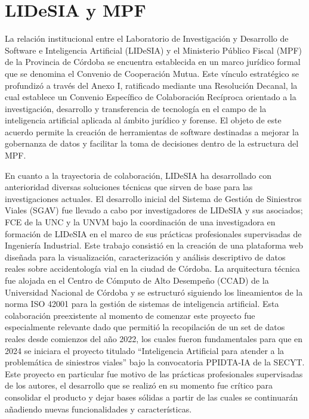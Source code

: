 \fi

\section{LIDeSIA y MPF}\label{lidesia-y-mpf}

La relación institucional entre el Laboratorio de Investigación y Desarrollo de Software e Inteligencia Artificial (LIDeSIA) y el Ministerio Público Fiscal (MPF) de la Provincia de Córdoba se encuentra establecida en un marco jurídico formal que se denomina el Convenio de Cooperación Mutua. Este vínculo estratégico se profundizó a través del Anexo I, ratificado mediante una Resolución Decanal, la cual establece un Convenio Específico de Colaboración Recíproca orientado a la investigación, desarrollo y transferencia de tecnología en el campo de la inteligencia artificial aplicada al ámbito jurídico y forense. El objeto de este acuerdo permite la creación de herramientas de software destinadas a mejorar la gobernanza de datos y facilitar la toma de decisiones dentro de la estructura del MPF.

En cuanto a la trayectoria de colaboración, LIDeSIA ha desarrollado con anterioridad diversas soluciones técnicas que sirven de base para las investigaciones actuales. El desarrollo inicial del Sistema de Gestión de Siniestros Viales (SGAV) fue llevado a cabo por investigadores de LIDeSIA y sus asociados; FCE de la UNC y la UNVM bajo la coordinación de una investigadora en formación de LIDeSIA en el marco de sus prácticas profesionales supervisadas de Ingeniería Industrial. Este trabajo consistió en la creación de una plataforma web diseñada para la visualización, caracterización y análisis descriptivo de datos reales sobre accidentología vial en la ciudad de Córdoba. La arquitectura técnica fue alojada en el Centro de Cómputo de Alto Desempeño (CCAD) de la Universidad Nacional de Córdoba y se estructuró siguiendo los lineamientos de la norma ISO 42001 para la gestión de sistemas de inteligencia artificial. Esta colaboración preexistente al momento de comenzar este proyecto fue especialmente relevante dado que permitió la recopilación de un set de datos reales desde comienzos del año 2022, los cuales fueron fundamentales para que en 2024 se iniciara el proyecto titulado “Inteligencia Artificial para atender a la problemática de siniestros viales'' bajo la convocatoria PPIDTA-IA de la SECYT. Este proyecto en particular fue motivo de las prácticas profesionales supervisadas de los autores, el desarrollo que se realizó en su momento fue crítico para consolidar el producto y dejar bases sólidas a partir de las cuales se continuarán añadiendo nuevas funcionalidades y características.

